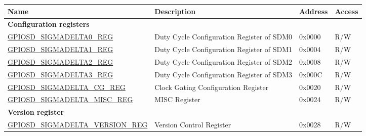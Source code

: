 \begin{longtable}{ | p{6cm} | p{7.2cm} | p{1.3cm} | p{1cm} | }
\hline\rowcolor{lightgray}
Name & Description &  Address & Access \\ \hline
\endhead
\multicolumn{4}{|l|}{\textbf{Configuration registers}} \\ \hline
\hyperref[regdesc:GPIOSDSIGMADELTANREG]{GPIOSD\_SIGMADELTA0\_REG} & Duty Cycle Configuration Register of SDM0 & 0x0000 & R/W \\ \hline
\hyperref[regdesc:GPIOSDSIGMADELTANREG]{GPIOSD\_SIGMADELTA1\_REG} & Duty Cycle Configuration Register of SDM1 & 0x0004 & R/W \\ \hline
\hyperref[regdesc:GPIOSDSIGMADELTANREG]{GPIOSD\_SIGMADELTA2\_REG} & Duty Cycle Configuration Register of SDM2 & 0x0008 & R/W \\ \hline
\hyperref[regdesc:GPIOSDSIGMADELTANREG]{GPIOSD\_SIGMADELTA3\_REG} & Duty Cycle Configuration Register of SDM3 & 0x000C & R/W \\ \hline
\hyperref[regdesc:GPIOSDSIGMADELTACGREG]{GPIOSD\_SIGMADELTA\_CG\_REG} & Clock Gating Configuration Register & 0x0020 & R/W \\ \hline
\hyperref[regdesc:GPIOSDSIGMADELTAMISCREG]{GPIOSD\_SIGMADELTA\_MISC\_REG} & MISC Register & 0x0024 & R/W \\ \hline
\multicolumn{4}{|l|}{\textbf{Version register}} \\ \hline
\hyperref[regdesc:GPIOSDSIGMADELTAVERSIONREG]{GPIOSD\_SIGMADELTA\_VERSION\_REG} & Version Control Register & 0x0028 & R/W \\ \hline
\end{longtable}
